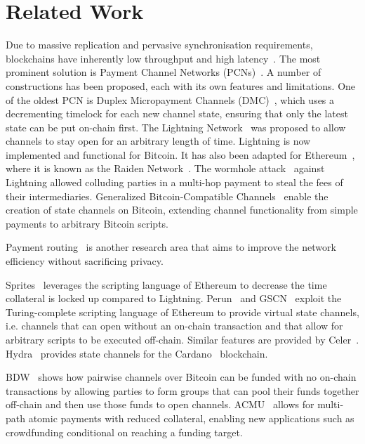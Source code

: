 \section{Related Work}
  Due to massive replication and pervasive synchronisation requirements,
  blockchains have inherently low throughput and high latency~\cite{scaling}.
  The most prominent solution is Payment Channel Networks
  (PCNs)~\cite{DBLP:conf/fc/GudgeonMRMG20}. A number of constructions has been
  proposed, each with its own features and limitations. One of the oldest PCN is
  Duplex Micropayment Channels (DMC)~\cite{decker}, which uses a decrementing
  timelock for each new channel state, ensuring that only the latest state can
  be put on-chain first. The Lightning Network~\cite{lightning} was proposed to
  allow channels to stay open for an arbitrary length of time. Lightning is now
  implemented and functional for Bitcoin. It has also been adapted for
  Ethereum~\cite{wood2014ethereum}, where it is known as the Raiden
  Network~\cite{raiden}. The wormhole
  attack~\cite{DBLP:conf/ndss/MalavoltaMSKM19} against Lightning allowed
  colluding parties in a multi-hop payment to steal the fees of their
  intermediaries. Generalized Bitcoin-Compatible
  Channels~\cite{cryptoeprint:2020:476} enable the creation of state channels on
  Bitcoin, extending channel functionality from simple payments to arbitrary
  Bitcoin scripts.


  Payment routing~\cite{spider,prihodko2016flare} is another research area that
  aims to improve the network efficiency without sacrificing privacy.

  Sprites~\cite{sprites} leverages the scripting language of Ethereum to
  decrease the time collateral is locked up compared to Lightning.
  Perun~\cite{perun} and GSCN~\cite{DBLP:conf/ccs/DziembowskiFH18} exploit the
  Turing-complete scripting language of Ethereum to provide virtual state
  channels, i.e. channels that can open without an on-chain transaction and that
  allow for arbitrary scripts to be executed off-chain. Similar features are
  provided by Celer~\cite{dong2018celer}. Hydra~\cite{cryptoeprint:2020:299}
  provides state channels for the Cardano~\cite{cardano} blockchain.

  BDW~\cite{scalable-funding} shows how pairwise channels over Bitcoin can be
  funded with no on-chain transactions by allowing parties to form groups that
  can pool their funds together off-chain and then use those funds to open
  channels. ACMU~\cite{10.1145/3319535.3345666} allows for multi-path atomic
  payments with reduced collateral, enabling new applications such as
  crowdfunding conditional on reaching a funding target.

